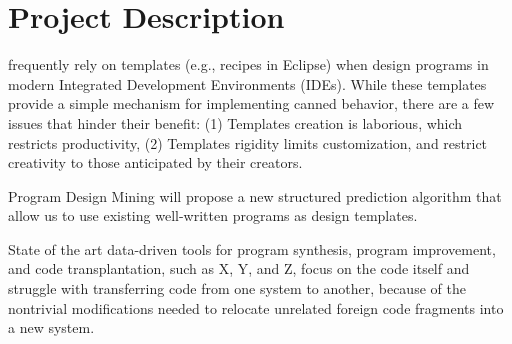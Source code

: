 \chapter{Project Description}{}
\label{sec:related}

 frequently rely on templates (e.g., 
recipes in Eclipse) when design programs in modern Integrated 
Development Environments (IDEs). While these templates provide 
a simple mechanism for implementing canned behavior, there are a 
few issues that hinder their benefit: (1) Templates creation 
is laborious, which restricts productivity, (2) Templates rigidity 
limits customization, and restrict creativity to those anticipated 
by their creators.

Program Design Mining will propose a new structured prediction 
algorithm that allow us to use existing well-written programs 
as design templates.    

State of the art data-driven tools for program synthesis, program 
improvement, and code transplantation, such as X, Y, and Z, focus 
on the code itself and struggle with transferring code from one system 
to another, because of the nontrivial modifications needed to relocate 
unrelated foreign code fragments into a new system. 